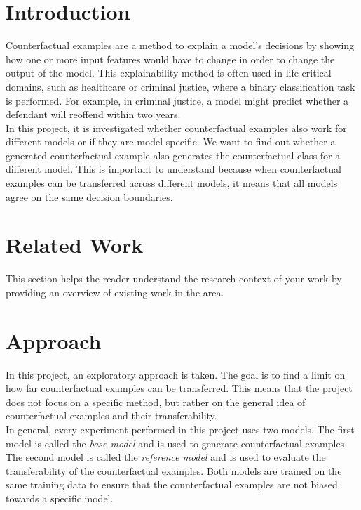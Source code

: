\documentclass{article}
\begin{document}
\section{Introduction}
Counterfactual examples are a method to explain a model's decisions by showing how one or more input features would have to change in order to change the output of the model. This explainability method is often used in life-critical domains, such as healthcare or criminal justice, where a binary classification task is performed. For example, in criminal justice, a model might predict whether a defendant will reoffend within two years. \\
In this project, it is investigated whether counterfactual examples also work for different models or if they are model-specific. We want to find out whether a generated counterfactual example also generates the counterfactual class for a different model. This is important to understand because when counterfactual examples can be transferred across different models, it means that all models agree on the same decision boundaries.\\

\section{Related Work}
This section helps the reader understand the research context of your work by providing an overview of existing work in the area. \cite{rajpurkar2018know3}

\section{Approach}
In this project, an exploratory approach is taken. The goal is to find a limit on how far counterfactual examples can be transferred. This means that the project does not focus on a specific method, but rather on the general idea of counterfactual examples and their transferability. \\
In general, every experiment performed in this project uses two models. The first model is called the \textit{base model} and is used to generate counterfactual examples. The second model is called the \textit{reference model} and is used to evaluate the transferability of the counterfactual examples. Both models are trained on the same training data to ensure that the counterfactual examples are not biased towards a specific model.\\
\end{document}
